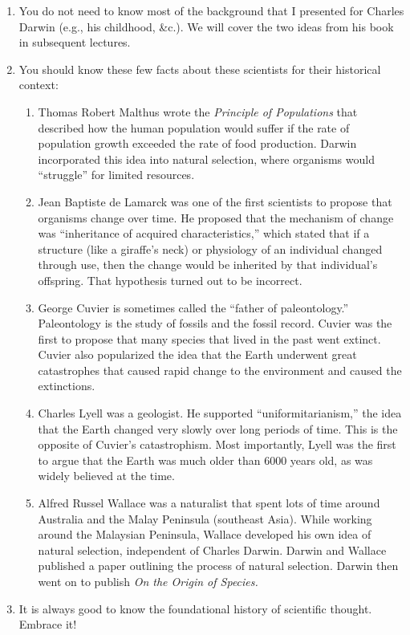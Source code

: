 \documentclass[letterpaper]{tufte-handout}
\begin{document}
\begin{enumerate}

	\item You do not need to know most of the background that I presented for Charles Darwin (e.g., his childhood, \&c.). We will cover the two ideas from his book in subsequent lectures.
	
	\item You should know these few facts about these scientists for their historical context:

	\begin{enumerate}[label=\alph*.]

	\item Thomas Robert Malthus wrote the \textit{Principle of Populations} that described how the human population would suffer if the rate of population growth exceeded the rate of food production. Darwin incorporated this idea into natural selection, where organisms would “struggle” for limited resources. 
	
	\item Jean Baptiste de Lamarck was one of the first scientists to propose that organisms change over time. He proposed that the mechanism of change was “inheritance of acquired characteristics,” which stated that if a structure (like a giraffe's neck) or physiology of an individual changed through use, then the change would be inherited by that individual's offspring. That hypothesis turned out to be incorrect.

	\item George Cuvier is sometimes called the “father of paleontology.” Paleontology is the study of fossils and the fossil record. Cuvier was the first to propose that many species that lived in the past went extinct. Cuvier also popularized the idea that the Earth underwent great catastrophes that caused rapid change to the environment and caused the extinctions.

	\item Charles Lyell was a geologist. He supported ``uniformitarianism,'' the idea that the Earth changed very slowly over long periods of time. This is the opposite of Cuvier's catastrophism. Most importantly, Lyell was the first to argue that the Earth was much older than 6000 years old, as was widely believed at the time.

	\item Alfred Russel Wallace was a naturalist that spent lots of time around Australia and the Malay Peninsula (southeast Asia). While working around the Malaysian Peninsula, Wallace developed his own idea of natural selection, independent of Charles Darwin.  Darwin and Wallace published a paper outlining the process of natural selection. Darwin then went on to publish \textit{On the Origin of Species.}

	\end{enumerate}
	
	\item It is always good to know the foundational history of scientific thought. Embrace it!

\end{enumerate}
\end{document}
